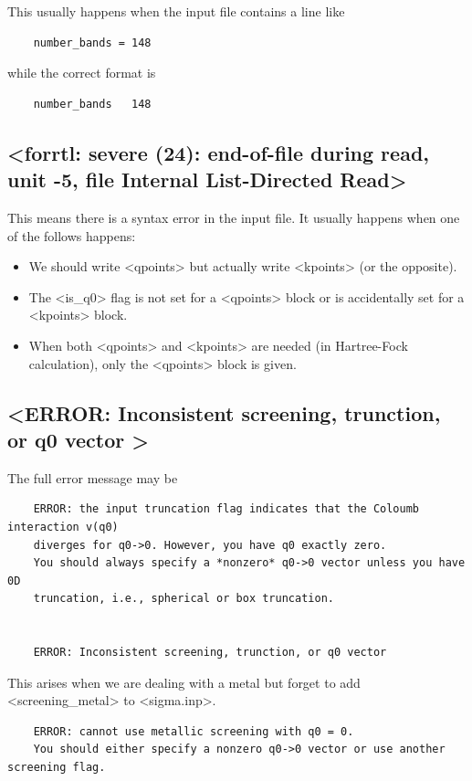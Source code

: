 \documentclass[hyperref, a4paper]{report}
\def\texttt#1{<#1>}%
\newcommand{\shortcode}[1]{\texttt{#1}}
\begin{document}
This usually happens when the input file contains a line like 
\begin{lstlisting}
    number_bands = 148 
\end{lstlisting}
while the correct format is 
\begin{lstlisting}
    number_bands   148 
\end{lstlisting}

\subsection{\shortcode{forrtl: severe (24): end-of-file during read, unit -5, file Internal List-Directed Read}}

This means there is a syntax error in the input file.
It usually happens when one of the follows happens:
\begin{itemize}
    \item We should write \shortcode{qpoints} but actually write \shortcode{kpoints}
    (or the opposite).
    \item The \shortcode{is_q0} flag is not set for a \shortcode{qpoints} block
    or is accidentally set for a \shortcode{kpoints} block.
    \item When both \shortcode{qpoints} and \shortcode{kpoints} are needed
    (in Hartree-Fock calculation), 
    only the \shortcode{qpoints} block is given.
\end{itemize}

\subsection{\shortcode{ERROR: Inconsistent screening, trunction, or q0 vector  }}

The full error message may be 
\begin{lstlisting}
    ERROR: the input truncation flag indicates that the Coloumb interaction v(q0)
    diverges for q0->0. However, you have q0 exactly zero.
    You should always specify a *nonzero* q0->0 vector unless you have 0D 
    truncation, i.e., spherical or box truncation.

    
    ERROR: Inconsistent screening, trunction, or q0 vector    
\end{lstlisting}
This arises when we are dealing with a metal 
but forget to add \shortcode{screening_metal} to \shortcode{sigma.inp}.

\begin{lstlisting}
    ERROR: cannot use metallic screening with q0 = 0.
    You should either specify a nonzero q0->0 vector or use another screening flag.
\end{lstlisting}
\end{document}
